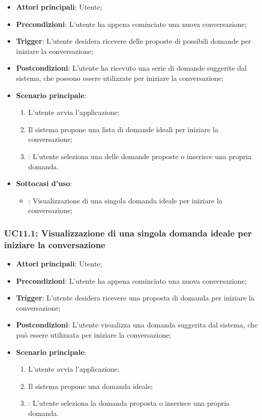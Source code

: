 \begin{itemize}
    \item \textbf{Attori principali}: Utente;
    \item \textbf{Precondizioni}: L'utente ha appena cominciato una nuova conversazione;
    \item \textbf{Trigger}: L'utente desidera ricevere delle proposte di possibili domande per iniziare la conversazione;
    \item \textbf{Postcondizioni}: L'utente ha ricevuto una serie di domande suggerite dal sistema, che possono essere utilizzate per iniziare la conversazione;
    \item \textbf{Scenario principale}:
    \begin{enumerate}
        \item L'utente avvia l'applicazione;
        \item Il sistema propone una lista di domande ideali per iniziare la conversazione;
        \item {}: L'utente seleziona una delle domande proposte o inserisce una propria domanda.
    \end{enumerate}
    \item \textbf{Sottocasi d'uso}:
    \begin{itemize}
        \item {}: Visualizzazione di una singola domanda ideale per iniziare la conversazione;
    \end{itemize}
\end{itemize}

\hypertarget{UC11.1}{}
\subsubsection{UC11.1: Visualizzazione di una singola domanda ideale per iniziare la conversazione}
\begin{itemize}
    \item \textbf{Attori principali}: Utente;
    \item \textbf{Precondizioni}: L'utente ha appena cominciato una nuova conversazione;
    \item \textbf{Trigger}: L'utente desidera ricevere una proposta di domanda per iniziare la conversazione;
    \item \textbf{Postcondizioni}: L'utente visualizza una domanda suggerita dal sistema, che può essere utilizzata per iniziare la conversazione;
    \item \textbf{Scenario principale}:
    \begin{enumerate}
        \item L'utente avvia l'applicazione;
        \item Il sistema propone una domanda ideale;
        \item {}: L'utente seleziona la domanda proposta o inserisce una propria domanda.
    \end{enumerate}
\end{itemize}

